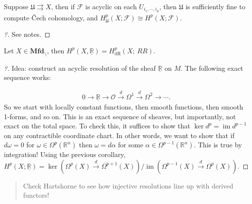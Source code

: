 \begin{corollary}

Suppose \(\mathfrak{U}\rightrightarrows X\), then if \(\mathcal{F}\) is
acyclic on each \(U_{i_1, \cdots, i_p}\), then \(\mathfrak{U}\) is
sufficiently fine to compute Čech cohomology, and
\(H^p_{\mathfrak{U}}(X; \mathcal{F}) \cong H^p(X; \mathcal{F})\).

\end{corollary}

\begin{proof}[?]

See notes.

\end{proof}

\begin{corollary}[of corollary]

Let \(X \in {\mathbf{Mfd}}_\setminus\), then
\(H^p(X, \underline{{\mathbb{R}}}) = H^p_{\mathrm{dR}}(X;\ RR)\).

\end{corollary}

\begin{proof}[?]

Idea: construct an acyclic resolution of the sheaf
\(\underline{{\mathbb{R}}}\) on \(M\). The following exact sequence
works:

\begin{align*}
0 \to \underline{{\mathbb{R}}} \to {\mathcal{O}}\xrightarrow{d} \Omega^1 \xrightarrow{d} \Omega^2 \to \cdots
.\end{align*}
So we start with locally constant functions, then smooth functions, then
smooth 1-forms, and so on. This is an exact sequence of sheaves, but
importantly, not exact on the total space. To check this, it suffices to
show that \(\ker d^p = \operatorname{im}d^{p-1}\) on any contractible
coordinate chart. In other words, we want to show that if \(d \omega=0\)
for \(\omega\in \Omega^p({\mathbb{R}}^n)\) then \(\omega= d \alpha\) for
some \(\alpha\in \Omega^{p-1}({\mathbb{R}}^n)\). This is true by
integration! Using the previous corollary,
\(H^p(X; \underline{{\mathbb{R}}}) = \ker(\Omega^p(X) \xrightarrow{d} \Omega^{p+1}(X) ) / \operatorname{im}(\Omega^{p-1}(X) \xrightarrow{d} \Omega^p(X))\).

\end{proof}

\begin{quote}
Check Hartshorne to see how injective resolutions line up with derived
functors!
\end{quote}

